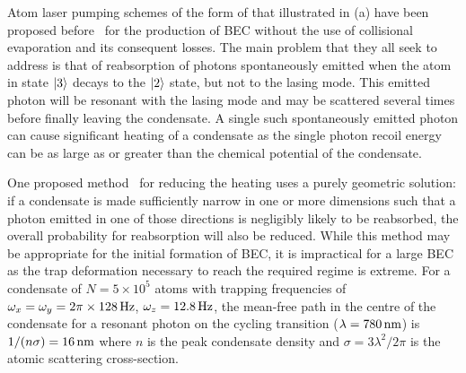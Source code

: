 Atom laser pumping schemes of the form of that illustrated in (a) have been proposed before~\citep{Olshanii:1996,Janicke:1996,Spreeuw:1995,Cirac:1996rr,Cirac:1996,Santos:2000,Castin:1998,Cirac:1994,Vengalattore:2003,Santos:2001ve,Wolf:2000,Santos:1999qf} for the production of BEC without the use of collisional evaporation and its consequent losses.  The main problem that they all seek to address is that of reabsorption of photons spontaneously emitted when the atom in state ${\left|3\right>}$ decays to the ${\left|2\right>}$ state, but not to the lasing mode.  This emitted photon will be resonant with the lasing mode and may be scattered several times before finally leaving the condensate.  A single such spontaneously emitted photon can cause significant heating of a condensate as the single photon recoil energy can be as large as or greater than the chemical potential of the condensate.

One proposed method~\citep{Castin:1998,Vengalattore:2003} for reducing the heating uses a purely geometric solution: if a condensate is made sufficiently narrow in one or more dimensions such that a photon emitted in one of those directions is negligibly likely to be reabsorbed, the overall probability for reabsorption will also be reduced.  While this method may be appropriate for the initial formation of BEC, it is impractical for a large BEC as the trap deformation necessary to reach the required regime is extreme.  For a  condensate of $N= 5\times 10^5$ atoms with trapping frequencies of $\omega_x = \omega_y = \unit[2\pi \times 128]{Hz}$, $\omega_z = \unit[12.8]{Hz}$, the mean-free path in the centre of the condensate for a resonant photon on the cycling transition ($\lambda = \unit[780]{nm}$) is $1/(n \sigma) = \unit[16]{nm}$ where $n$ is the peak condensate density and $\sigma = 3 \lambda^2/2 \pi$ is the atomic scattering cross-section.

